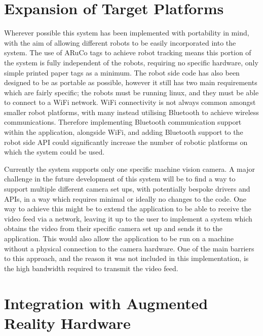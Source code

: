 \section{Expansion of Target Platforms}

Wherever possible this system has been implemented with portability in mind, with the aim of allowing different robots to be easily incorporated into the system. The use of ARuCo tags to achieve robot tracking means this portion of the system is fully independent of the robots, requiring no specific hardware, only simple printed paper tags as a minimum. The robot side code has also been designed to be as portable as possible, however it still has two main requirements which are fairly specific; the robots must be running linux, and they must be able to connect to a WiFi network. WiFi connectivity is not always common amongst smaller robot platforms, with many instead utilising Bluetooth to achieve wireless communications. Therefore implementing Bluetooth communication support within the application, alongside WiFi, and adding Bluetooth support to the robot side API could significantly increase the number of robotic platforms on which the system could be used.

Currently the system supports only one specific machine vision camera. A major challenge in the future development of this system will be to find a way to support multiple different camera set ups, with potentially bespoke drivers and APIs, in a way which requires minimal or ideally no changes to the code. One way to achieve this might be to extend the application to be able to receive the video feed via a network, leaving it up to the user to implement a system which obtains the video from their specific camera set up and sends it to the application. This would also allow the application to be run on a machine without a physical connection to the camera hardware. One of the main barriers to this approach, and the reason it was not included in this implementation, is the high bandwidth required to transmit the video feed.


\section{Integration with Augmented Reality Hardware}

